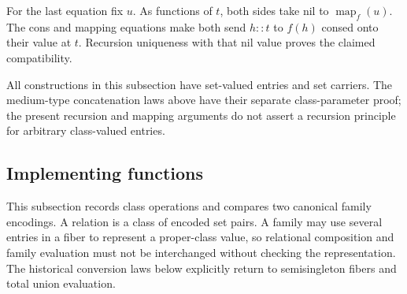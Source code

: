 For the last equation fix $u$. As functions of $t$, both sides take
nil to $\operatorname{map}_f(u)$. The cons and mapping equations make
both send $h::t$ to $f(h)$ consed onto their value at $t$. Recursion
uniqueness with that nil value proves the claimed compatibility.
\Done

All constructions in this subsection have set-valued entries and set
carriers. The medium-type concatenation laws above have their separate
class-parameter proof; the present recursion and mapping arguments do
not assert a recursion principle for arbitrary class-valued entries.
\pagebreak


\subsection{Implementing functions}
This subsection records class operations and compares two canonical family
encodings. A relation is a class of encoded set pairs. A family may use
several entries in a fiber to represent a proper-class value, so relational
composition and family evaluation must not be interchanged without checking
the representation. The historical conversion laws below explicitly return
to semisingleton fibers and total union evaluation.

